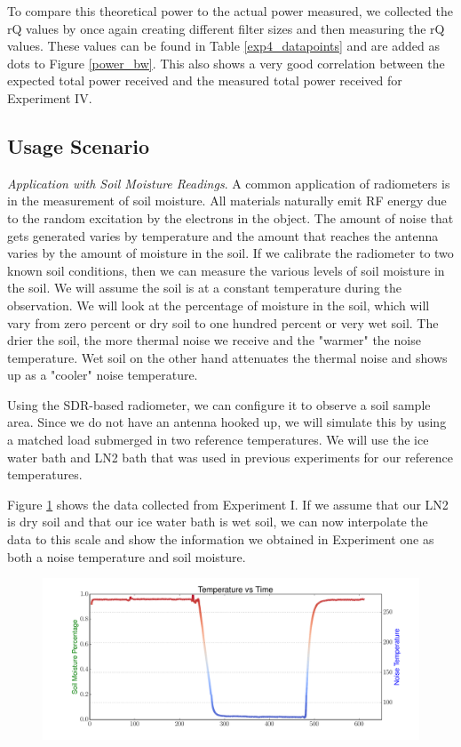 To compare this theoretical power to the actual power measured, we collected the rQ values by once again creating different filter sizes and then measuring the rQ values.  These values can be found in Table \ref{exp4_datapoints} and are added as dots to Figure \ref{power_bw}.  This also shows a very good correlation between the expected total power received and the measured total power received for Experiment IV.

\subsection{Usage Scenario}
\emph{Application with Soil Moisture Readings}.  A common application of radiometers is in the measurement of soil moisture.  All materials naturally emit RF energy due to the random excitation by the electrons in the object.  The amount of noise that gets generated varies by temperature and the amount that reaches the antenna varies by the amount of moisture in the soil.  If we calibrate the radiometer to two known soil conditions, then we can measure the various levels of soil moisture in the soil.  We will assume the soil is at a constant temperature during the observation.  We will look at the percentage of moisture in the soil, which will vary from zero percent or dry soil to one hundred percent or very wet soil.  The drier the soil, the more thermal noise we receive and the "warmer" the noise temperature.  Wet soil on the other hand attenuates the thermal noise and shows up as a "cooler" noise temperature.  

Using the SDR-based radiometer, we can configure it to observe a soil sample area.  Since we do not have an antenna hooked up, we will simulate this by using a matched load submerged in two reference temperatures.  We will use the ice water bath and LN2 bath that was used in previous experiments for our reference temperatures.

Figure \ref{SDR_soil} shows the data collected from Experiment I.  If we assume that our LN2 is dry soil and that our ice water bath is wet soil, we can now interpolate the data to this scale and show the information we obtained in Experiment one as both a noise temperature and soil moisture.

\begin{figure}[h!tb] \centering

\includegraphics[width=\textwidth]{Experiments/Exp1/sdr_soilmoisture.pdf}
\label{SDR_soil}
\end{figure}

